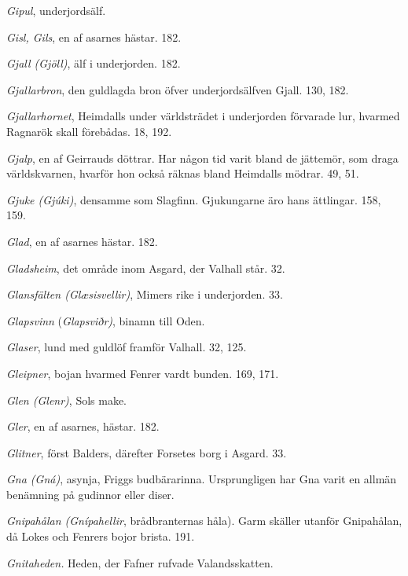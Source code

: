 \emph{Gipul}, underjordsälf.

\emph{Gisl, Gils}, en af asarnes hästar. 182.

\emph{Gjall (Gjöll)}, älf i underjorden. 182.

\emph{Gjallarbron}, den guldlagda bron öfver underjordsälfven Gjall.
130, 182.

\emph{Gjallarhornet}, Heimdalls under världsträdet i underjorden
förvarade lur, hvarmed Ragnarök skall förebådas. 18, 192.

\emph{Gjalp}, en af Geirrauds döttrar. Har någon tid varit bland de
jättemör, som draga världskvarnen, hvarför hon också räknas bland
Heimdalls mödrar. 49, 51.

\emph{Gjuke (Gjúki)}, densamme som Slagfinn. Gjukungarne äro hans
ättlingar. 158, 159.

\emph{Glad}, en af asarnes hästar. 182.

\emph{Gladsheim}, det område inom Asgard, der Valhall står. 32.

\emph{Glansfälten (Glæsisvellir)}, Mimers rike i underjorden. 33.

\emph{Glapsvinn} (\emph{Glapsviðr)}, binamn till Oden.

\protect\hypertarget{lb1625905.xhtmlux5cux23start219}{}{}\protect\hypertarget{lb1625905.xhtmlux5cux23start219-a}{}{}\protect\hypertarget{lb1625905.xhtmlux5cux23start219-b}{}{}\protect\hypertarget{lb1625905.xhtmlux5cux23start219-c}{}{}\protect\hypertarget{lb1625905.xhtmlux5cux23start219-d}{}{}

\emph{Glaser}, lund med guldlöf framför Valhall. 32, 125.

\emph{Gleipner}, bojan hvarmed Fenrer vardt bunden. 169, 171.

\emph{Glen (Glenr)}, Sols make.

\emph{Gler}, en af asarnes, hästar. 182.

\emph{Glitner}, först Balders, därefter Forsetes borg i Asgard. 33.

\emph{Gna (Gná)}, asynja, Friggs budbärarinna. Ursprungligen har Gna
varit en allmän benämning på gudinnor eller diser.

\emph{Gnipahålan (Gnípahellir}, brådbranternas håla). Garm skäller
utanför Gnipahålan, då Lokes och Fenrers bojor brista. 191.

\emph{Gnitaheden.} Heden, der Fafner rufvade Valandsskatten.

